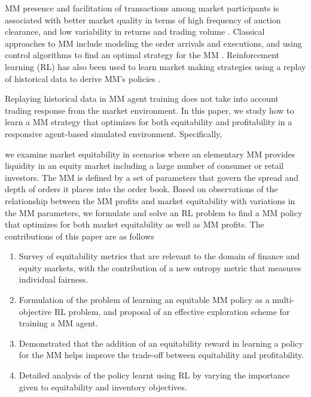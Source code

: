 \documentclass[sigconf]{acmart}
\begin{document}
{MM presence and facilitation of transactions among market participants is associated with better market quality in terms of high frequency of auction clearance, and low variability in returns and trading volume \cite{mm}. Classical approaches to MM include modeling the order arrivals and executions, and using control algorithms to find an optimal strategy for the MM \cite{chakraborty2011market}. Reinforcement learning (RL) has also been used to learn market making strategies using a replay of historical data to derive MM's policies \cite{sutton2018reinforcement,SpoonerMarketMaking,chan2001electronic}.

Replaying historical data in MM agent training does not take into account trading response from the market environment. In this paper, we study how to learn a MM strategy that optimizes for both equitability and profitability in a responsive agent-based simulated environment. Specifically, }we examine market equitability in scenarios where an elementary MM provides liquidity in an equity market including a large number of consumer or retail investors. The MM is defined by a set of parameters that govern the spread and depth of orders it places into the order book. Based on observations of the relationship between the MM profits and market equitability with variations in the MM parameters, we formulate and solve an RL problem to find a MM policy that optimizes for both market equitability as well as MM profits. The contributions of this paper are as follows
\begin{enumerate}
    \item Survey of equitability metrics that are relevant to the domain of finance and equity markets, with the contribution of a new entropy metric that measures individual fairness. 
    \item Formulation of the problem of learning an equitable MM policy as a multi-objective RL problem, and proposal of an effective exploration scheme for training a MM agent.
    \item Demonstrated that the addition of an equitability reward in learning a policy for the MM helps improve the trade-off between equitability and profitability.
    \item Detailed analysis of the policy learnt using RL by varying the importance given to equitability and inventory objectives.
\end{enumerate}
\end{document}
